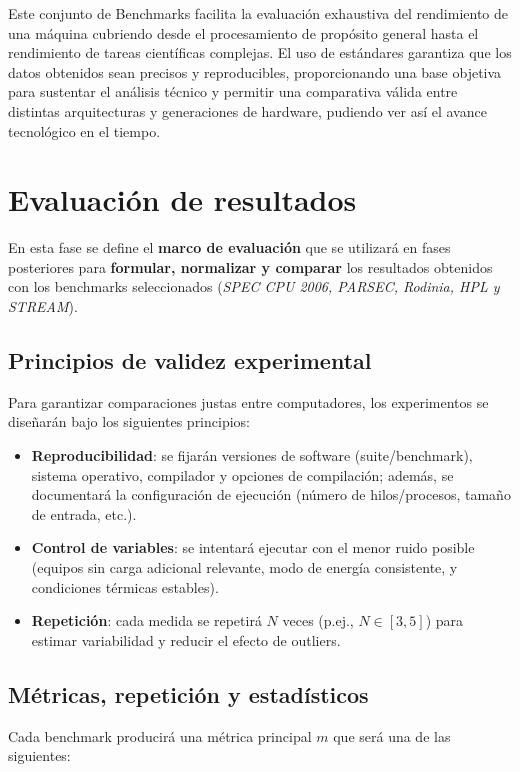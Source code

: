 \documentclass[11pt,a4paper]{article}
\begin{document}
Este conjunto de Benchmarks facilita la evaluación exhaustiva del rendimiento de una máquina cubriendo desde el procesamiento de propósito general hasta el rendimiento de tareas científicas complejas. El uso de estándares 
garantiza que los datos obtenidos sean precisos y reproducibles, proporcionando una base objetiva para sustentar el análisis técnico y permitir una comparativa válida entre distintas arquitecturas y generaciones de hardware,
pudiendo ver así el avance tecnológico en el tiempo.

\section{Evaluación de resultados}
\label{sec:evaluacion_resultados}

En esta fase se define el \textbf{marco de evaluación} que se utilizará en fases posteriores para
\textbf{formular, normalizar y comparar} los resultados obtenidos con los benchmarks seleccionados
(\textit{SPEC CPU 2006, PARSEC, Rodinia, HPL y STREAM}).

\subsection{Principios de validez experimental}
Para garantizar comparaciones justas entre computadores, los experimentos se diseñarán bajo los siguientes principios:

\begin{itemize}
  \item \textbf{Reproducibilidad}: se fijarán versiones de software (suite/benchmark), sistema operativo, compilador y opciones
  de compilación; además, se documentará la configuración de ejecución (número de hilos/procesos, tamaño de entrada, etc.).
  \item \textbf{Control de variables}: se intentará ejecutar con el menor ruido posible (equipos sin carga adicional relevante,
  modo de energía consistente, y condiciones térmicas estables).
  \item \textbf{Repetición}: cada medida se repetirá $N$ veces (p.ej., $N\in[3,5]$) para estimar variabilidad y reducir el efecto de outliers.
\end{itemize}

\subsection{Métricas, repetición y estadísticos}
Cada benchmark producirá una métrica principal $m$ que será una de las siguientes:
\end{document}

